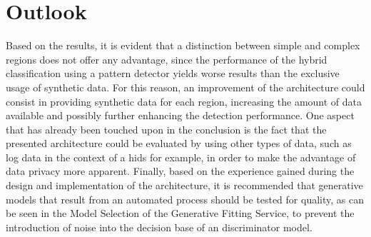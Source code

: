 \documentclass[../../main.tex]{subfiles}
\begin{document}
\section{Outlook}\label{sec:outlook}

Based on the results, it is evident that a distinction between simple and complex regions does not offer any advantage, since the performance of the hybrid classification using a pattern detector yields worse results than the exclusive usage of synthetic data. For this reason, an improvement of the architecture could consist in providing synthetic data for each region, increasing the amount of data available and possibly further enhancing the detection performance. One aspect that has already been touched upon in the conclusion is the fact that the presented architecture could be evaluated by using other types of data, such as log data in the context of a \gls{hids} for example, in order to make the advantage of data privacy more apparent. Finally, based on the experience gained during the design and implementation of the architecture, it is recommended that generative models that result from an automated process should be tested for quality, as can be seen in the Model Selection of the Generative Fitting Service, to prevent the introduction of noise into the decision base of an discriminator model.
\end{document}
